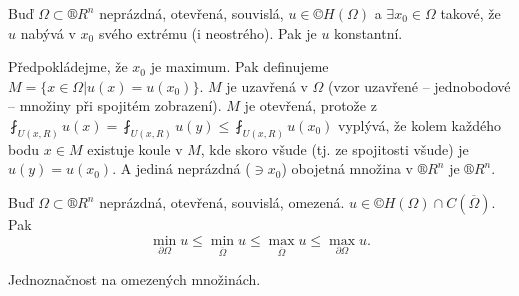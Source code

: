 \documentclass[12pt]{article}					%
\begin{document}
\begin{veta}
	Buď $\Omega \subset ®R^n$ neprázdná, otevřená, souvislá, $u \in ©H(\Omega)$ a $\exists x_0 \in \Omega$ takové, že $u$ nabývá v $x_0$ svého extrému (i neostrého). Pak je $u$ konstantní.

	\begin{dukazin}
		Předpokládejme, že $x_0$ je maximum. Pak definujeme $M = \{x \in \Omega | u(x) = u(x_0)\}$. $M$ je uzavřená v $\Omega$ (vzor uzavřené – jednobodové – množiny při spojitém zobrazení). $M$ je otevřená, protože z $\fint_{U(x, R)} u(x) = \fint_{U(x, R)} u(y) ≤ \fint_{U(x, R)} u(x_0)$ vyplývá, že kolem každého bodu $x \in M$ existuje koule v $M$, kde skoro všude (tj. ze spojitosti všude) je $u(y) = u(x_0)$. A jediná neprázdná ($\ni x_0$) obojetná množina v $®R^n$ je $®R^n$.
	\end{dukazin}
\end{veta}

\begin{dusledek}
	Buď $\Omega \subset ®R^n$ neprázdná, otevřená, souvislá, omezená. $u \in ©H(\Omega) \cap C(\overline{\Omega})$. Pak
	$$ \min_{\partial \Omega} u ≤ \min_{\overline{\Omega}} u ≤ \max_{\overline{\Omega}} u ≤ \max_{\partial \Omega} u. $$
\end{dusledek}

\begin{dusledek}
	Jednoznačnost na omezených množinách.
\end{dusledek}
\end{document}

